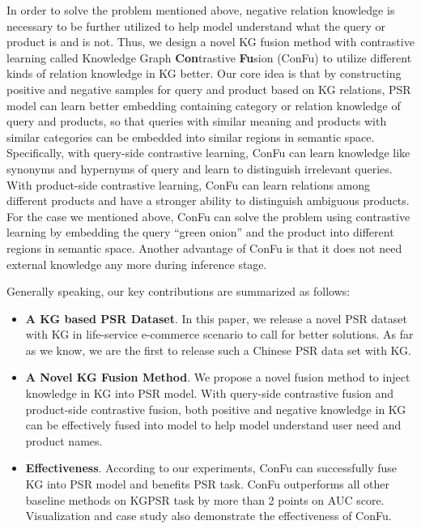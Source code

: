 In order to solve the problem mentioned above, negative relation knowledge is necessary to be further utilized to help model understand what the query or product is and is not. 
Thus, we design a novel KG fusion method with contrastive learning called Knowledge Graph \textbf{Con}trastive \textbf{Fu}sion (ConFu) to utilize different kinds of relation knowledge in KG better. 
Our core idea is that by constructing positive and negative samples for query and product based on KG relations, PSR model can learn better embedding containing category or relation knowledge of query and products, so that queries with similar meaning and products with similar categories can be embedded into similar regions in semantic space.
Specifically, with query-side contrastive learning, ConFu can learn knowledge like synonyms and hypernyms of query and learn to distinguish irrelevant queries. 
With product-side contrastive learning, ConFu can learn relations among different products and have a stronger ability to distinguish ambiguous products. 
For the case we mentioned above, ConFu can solve the problem using contrastive learning by embedding the query ``green onion'' and the product into different regions in semantic space.
Another advantage of ConFu is that it does not need external knowledge any more during inference stage. 

Generally speaking, our key contributions are summarized as follows: 

\begin{itemize}
    \item \textbf{A KG based PSR Dataset}. In this paper, we release a novel PSR dataset with KG in life-service e-commerce scenario to call for better solutions. As far as we know, we are the first to release such a Chinese PSR data set with KG. 
    \item \textbf{A Novel KG Fusion Method}. We propose a novel fusion method to inject knowledge in KG into PSR model. With query-side contrastive fusion and product-side contrastive fusion, both positive and negative knowledge in KG can be effectively fused into model to help model understand user need and product names.
    \item \textbf{Effectiveness}. According to our experiments, ConFu can successfully fuse KG into PSR model and benefits PSR task. ConFu outperforms all other baseline methods on KGPSR task by more than 2 points on AUC score. Visualization and case study also demonstrate the effectiveness of ConFu. 
\end{itemize}


